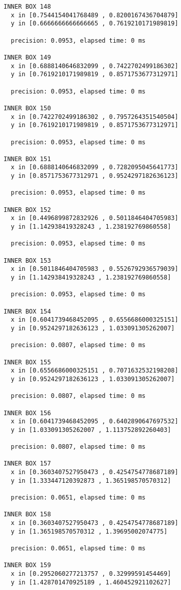 \begin{verbatim}
INNER BOX 148
  x in [0.7544154041768489 , 0.8200167436704879]
  y in [0.6666666666666665 , 0.7619210171989819]

  precision: 0.0953, elapsed time: 0 ms

INNER BOX 149
  x in [0.6888140646832099 , 0.7422702499186302]
  y in [0.7619210171989819 , 0.8571753677312971]

  precision: 0.0953, elapsed time: 0 ms

INNER BOX 150
  x in [0.7422702499186302 , 0.7957264351540504]
  y in [0.7619210171989819 , 0.8571753677312971]

  precision: 0.0953, elapsed time: 0 ms

INNER BOX 151
  x in [0.6888140646832099 , 0.7282095045641773]
  y in [0.8571753677312971 , 0.9524297182636123]

  precision: 0.0953, elapsed time: 0 ms

INNER BOX 152
  x in [0.4496899872832926 , 0.5011846404705983]
  y in [1.142938419328243 , 1.238192769860558]

  precision: 0.0953, elapsed time: 0 ms

INNER BOX 153
  x in [0.5011846404705983 , 0.5526792936579039]
  y in [1.142938419328243 , 1.238192769860558]

  precision: 0.0953, elapsed time: 0 ms

INNER BOX 154
  x in [0.6041739468452095 , 0.6556686000325151]
  y in [0.9524297182636123 , 1.033091305262007]

  precision: 0.0807, elapsed time: 0 ms

INNER BOX 155
  x in [0.6556686000325151 , 0.7071632532198208]
  y in [0.9524297182636123 , 1.033091305262007]

  precision: 0.0807, elapsed time: 0 ms

INNER BOX 156
  x in [0.6041739468452095 , 0.6402890647697532]
  y in [1.033091305262007 , 1.113752892260403]

  precision: 0.0807, elapsed time: 0 ms

INNER BOX 157
  x in [0.3603407527950473 , 0.4254754778687189]
  y in [1.333447120392873 , 1.365198570570312]

  precision: 0.0651, elapsed time: 0 ms

INNER BOX 158
  x in [0.3603407527950473 , 0.4254754778687189]
  y in [1.365198570570312 , 1.39695002074775]

  precision: 0.0651, elapsed time: 0 ms

INNER BOX 159
  x in [0.2952060277213757 , 0.32999591454469]
  y in [1.428701470925189 , 1.460452921102627]


\end{verbatim}

